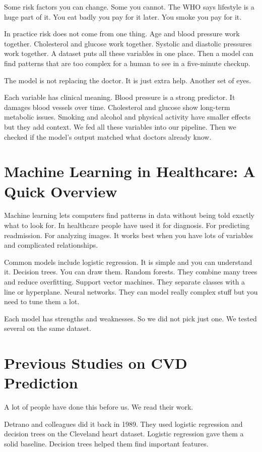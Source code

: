 \documentclass[12pt, a4paper, oneside]{book}
\begin{document}
Some risk factors you can change. Some you cannot. The WHO says lifestyle is a huge part of it. You eat badly you pay for it later. You smoke you pay for it.

In practice risk does not come from one thing. Age and blood pressure work together. Cholesterol and glucose work together. Systolic and diastolic pressures work together. A dataset puts all these variables in one place. Then a model can find patterns that are too complex for a human to see in a five-minute checkup.

The model is not replacing the doctor. It is just extra help. Another set of eyes.

Each variable has clinical meaning. Blood pressure is a strong predictor. It damages blood vessels over time. Cholesterol and glucose show long-term metabolic issues. Smoking and alcohol and physical activity have smaller effects but they add context. We fed all these variables into our pipeline. Then we checked if the model's output matched what doctors already know.

\section{Machine Learning in Healthcare: A Quick Overview}
Machine learning lets computers find patterns in data without being told exactly what to look for. In healthcare people have used it for diagnosis. For predicting readmission. For analyzing images. It works best when you have lots of variables and complicated relationships.

Common models include logistic regression. It is simple and you can understand it. Decision trees. You can draw them. Random forests. They combine many trees and reduce overfitting. Support vector machines. They separate classes with a line or hyperplane. Neural networks. They can model really complex stuff but you need to tune them a lot.

Each model has strengths and weaknesses. So we did not pick just one. We tested several on the same dataset.

\section{Previous Studies on CVD Prediction}
A lot of people have done this before us. We read their work.

Detrano and colleagues did it back in 1989. They used logistic regression and decision trees on the Cleveland heart dataset. Logistic regression gave them a solid baseline. Decision trees helped them find important features.
\end{document}
